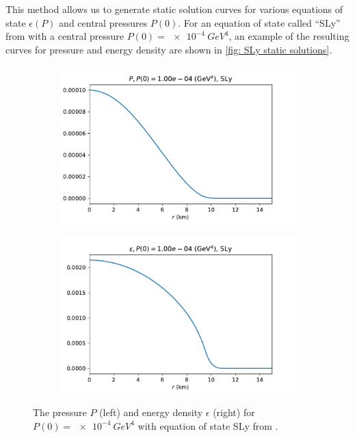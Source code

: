 This method allows us to generate static solution curves for various equations of state $\epsilon (P)$ and central pressures $P(0)$. For an equation of state called ``SLy'' from \autocite{SLy_2004} with a central pressure $P(0) = \SI{e-4}{GeV^4}$, an example of the resulting curves for pressure and energy density are shown in \autoref{fig: SLy static solutions}.

\begin{figure}[h!]
    \centering
    \begin{subfigure}{.5\textwidth}
        \includegraphics[width=\textwidth]{images/tov/SLy_P,p0_0.0001.pdf}
    \end{subfigure}%
    \begin{subfigure}{.5\textwidth}
        \includegraphics[width=\textwidth]{images/tov/SLy_rho,p0_0.0001.pdf}
    \end{subfigure}
    \caption{The pressure $P$ (left) and energy density $\epsilon$ (right) for $P(0) = \SI{e-4}{GeV^4}$ with equation of state SLy from \autocite{SLy_2004}.}
    \label{fig: SLy static solutions}
\end{figure}

